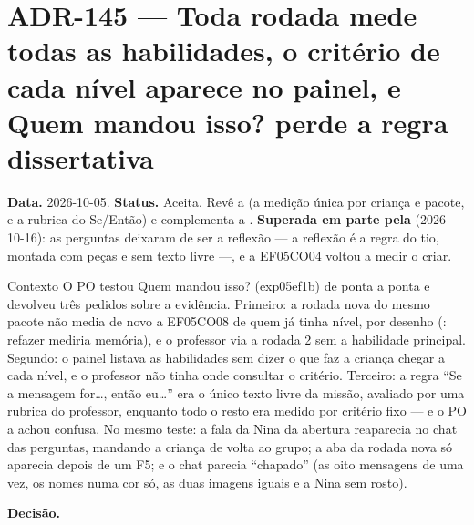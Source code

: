 \section{ADR-145 --- Toda rodada mede todas as habilidades, o critério de cada nível aparece no painel, e Quem mandou isso? perde a regra dissertativa}
\label{adr:rodada-mede-tudo}

\textbf{Data.} 2026-10-05. \textbf{Status.} Aceita. Revê a 
(a medição única por criança e pacote, e a rubrica do Se/Então) e complementa
a . \textbf{Superada em parte pela }
(2026-10-16): as perguntas deixaram de ser a reflexão --- a reflexão é a regra
do tio, montada com peças e sem texto livre ---, e a EF05CO04 voltou a medir o
criar.

\begin{especificacao}{Contexto}
O PO testou Quem mandou isso? (exp05ef1b) de ponta a ponta e devolveu três
pedidos sobre a evidência. Primeiro: a rodada nova do mesmo pacote não media
de novo a EF05CO08 de quem já tinha nível, por desenho (: refazer
mediria memória), e o professor via a rodada 2 sem a habilidade principal.
Segundo: o painel listava as habilidades sem dizer o que faz a criança chegar
a cada nível, e o professor não tinha onde consultar o critério. Terceiro: a
regra \enquote{Se a mensagem for\ldots, então eu\ldots} era o único texto livre
da missão, avaliado por uma rubrica do professor, enquanto todo o resto era
medido por critério fixo --- e o PO a achou confusa. No mesmo teste: a fala da
Nina da abertura reaparecia no chat das perguntas, mandando a criança de volta
ao grupo; a aba da rodada nova só aparecia depois de um F5; e o chat parecia
\enquote{chapado} (as oito mensagens de uma vez, os nomes numa cor só, as duas
imagens iguais e a Nina sem rosto).
\end{especificacao}

\textbf{Decisão.}

